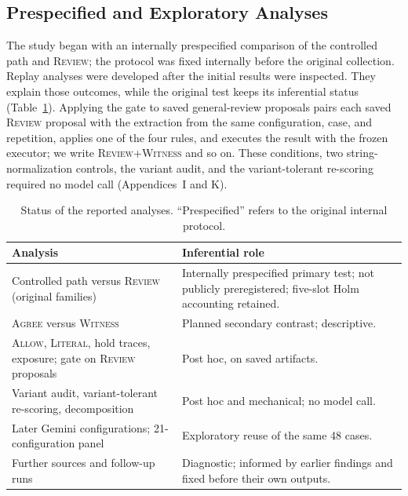 \documentclass[acmsmall,review,anonymous]{acmart}
\newcommand{\agree}{\textsc{Agree}}
\newcommand{\allow}{\textsc{Allow}}
\newcommand{\literal}{\textsc{Literal}}
\newcommand{\witness}{\textsc{Witness}}
\newcommand{\review}{\textsc{Review}}
\begin{document}
\subsection{Prespecified and Exploratory Analyses}\label{sec:analysis-status}
The study began with an internally prespecified comparison of the controlled path and \review{}; the protocol was fixed internally before the original collection. Replay analyses were developed after the initial results were inspected. They explain those outcomes, while the original test keeps its inferential status (Table~\ref{tab:5}). Applying the gate to saved general-review proposals pairs each saved \review{} proposal with the extraction from the same configuration, case, and repetition, applies one of the four rules, and executes the result with the frozen executor; we write \review{}+\witness{} and so on. These conditions, two string-normalization controls, the variant audit, and the variant-tolerant re-scoring required no model call (Appendices~I and K).

\begin{table}[tbp]
\centering
\caption{Status of the reported analyses. ``Prespecified'' refers to the original internal protocol.}\label{tab:5}
\small
\setlength{\tabcolsep}{3pt}
\begin{tabular}{@{}>{\raggedright\arraybackslash}p{}>{\raggedright\arraybackslash}p{}@{}}
\toprule
\textbf{Analysis} & \textbf{Inferential role} \\
\midrule
Controlled path versus \review{} (original families) & Internally prespecified primary test; not publicly preregistered; five-slot Holm accounting retained. \\
\agree{} versus \witness{} & Planned secondary contrast; descriptive. \\
\allow{}, \literal{}, hold traces, exposure; gate on \review{} proposals & Post hoc, on saved artifacts. \\
Variant audit, variant-tolerant re-scoring, decomposition & Post hoc and mechanical; no model call. \\
Later Gemini configurations; 21-configuration panel & Exploratory reuse of the same 48 cases. \\
Further sources and follow-up runs & Diagnostic; informed by earlier findings and fixed before their own outputs. \\
\bottomrule
\end{tabular}
\end{table}
\end{document}

